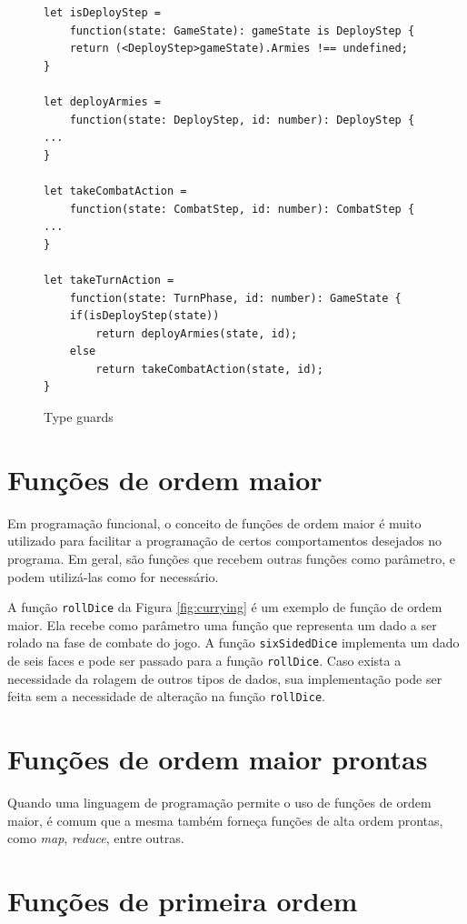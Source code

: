 \documentclass[rel_mlp]{iiufrgs}
\numberwithin{figure}{chapter}
\begin{document}
\begin{figure}[h]
\begin{verbatim}
let isDeployStep =
    function(state: GameState): gameState is DeployStep {
    return (<DeployStep>gameState).Armies !== undefined;
}

let deployArmies =
    function(state: DeployStep, id: number): DeployStep {
...
}

let takeCombatAction =
    function(state: CombatStep, id: number): CombatStep {
...
}

let takeTurnAction =
    function(state: TurnPhase, id: number): GameState {
    if(isDeployStep(state))
        return deployArmies(state, id);
    else
        return takeCombatAction(state, id);
}
\end{verbatim}
\caption{Type guards}
\label{fig:typeguards}
\end{figure}

\section{Funções de ordem maior}

Em programação funcional, o conceito de funções de ordem maior é muito utilizado para facilitar a programação de certos comportamentos desejados no programa. Em geral, são funções que recebem outras funções como parâmetro, e podem utilizá-las como for necessário.

A função \texttt{rollDice} da Figura \ref{fig:currying} é um exemplo de função de ordem maior. Ela recebe como parâmetro uma função que representa um dado a ser rolado na fase de combate do jogo. A função \texttt{sixSidedDice} implementa um dado de seis faces e pode ser passado para a função \texttt{rollDice}. Caso exista a necessidade da rolagem de outros tipos de dados, sua implementação pode ser feita sem a necessidade de alteração na função \texttt{rollDice}.


\section{Funções de ordem maior prontas}

Quando uma linguagem de programação permite o uso de funções de ordem maior, é comum que a mesma também forneça funções de alta ordem prontas, como \textit{map}, \textit{reduce}, entre outras. 


\section{Funções de primeira ordem}
\end{document}
